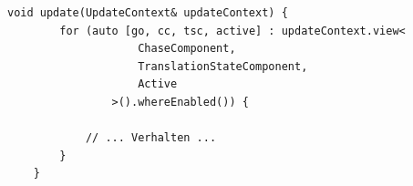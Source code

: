 \vspace{5mm}
\begin{lstlisting}[style=c++style,
    caption={Quellcode-Skizze einer \texttt{update}-Implementierung, die einen View ausschließlich über aktive GameObjects erstellt, bei denen die aufgeführten Komponenten auch \textit{enabled} sind. Auf die Rolle von \texttt{UpdateContext} wird in Abschnitt~\ref{sec:runtime_gameloop} näher eingegangen.},
    label=lst:system_loop]
    void update(UpdateContext& updateContext) {
        for (auto [go, cc, tsc, active] : updateContext.view<
                    ChaseComponent,
                    TranslationStateComponent,
                    Active
                >().whereEnabled()) {

            // ... Verhalten ...
        }
    }
\end{lstlisting}
\vspace{5mm}

